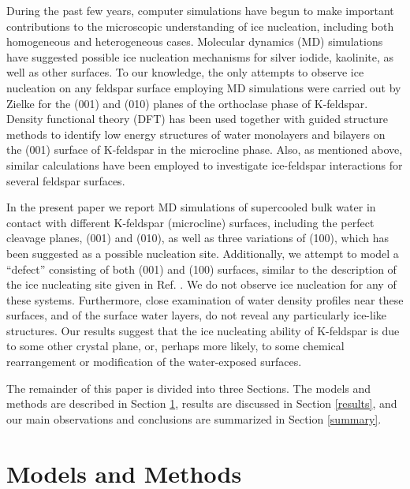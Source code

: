 \documentclass[preprint,aps,prb,floatfix]{revtex4-1}
\begin{document}
During the past few years, computer simulations have begun to make important contributions to the microscopic understanding of ice nucleation,\cite{SCCFPZM16} including both homogeneous\cite{MM10,ESVV14,HD15} and heterogeneous\cite{LHV14,QOHM17,CKSM15,ZBP15a,FD14,CRKSM14,ZBP15b} cases. Molecular dynamics (MD) simulations have suggested possible ice nucleation mechanisms for silver iodide,\cite{ZBP15a,FD14} kaolinite,\cite{CRKSM14,ZBP15b} as well as other surfaces.\cite{LHV14,QOHM17,CKSM15} To our knowledge, the only attempts to observe ice nucleation on any feldspar surface employing MD simulations were carried out by Zielke\cite{Z16} for the (001) and (010) planes of the orthoclase phase of K-feldspar. Density functional theory (DFT) has been used together with guided structure methods to identify low energy structures of water monolayers and bilayers on the (001) surface of K-feldspar in the microcline phase.\cite{PCSM16} Also, as mentioned above, similar calculations have been employed to investigate ice-feldspar interactions for several feldspar surfaces.\cite{KBPC17}

In the present paper we report MD simulations of supercooled bulk water in contact with different K-feldspar (microcline) surfaces, including the perfect cleavage planes, (001) and (010), as well as three variations of (100), which has been suggested as a possible nucleation site.\cite{KBPC17} Additionally, we attempt to model a ``defect'' consisting of both (001) and (100) surfaces, similar to the description of the ice nucleating site given in Ref. . We do not observe ice nucleation for any of these systems. Furthermore, close examination of water density profiles near these surfaces, and of the surface water layers, do not reveal any particularly ice-like structures. Our results suggest that the ice nucleating ability of K-feldspar is due to some other crystal plane, or, perhaps more likely, to some chemical rearrangement or modification of the water-exposed surfaces.  

The remainder of this paper is divided into three Sections. The models and methods are described in Section \ref{modmed}, results are discussed in Section \ref{results}, and our main observations and conclusions are summarized in Section \ref{summary}.

\section{Models and Methods}
\label{modmed}
\end{document}
